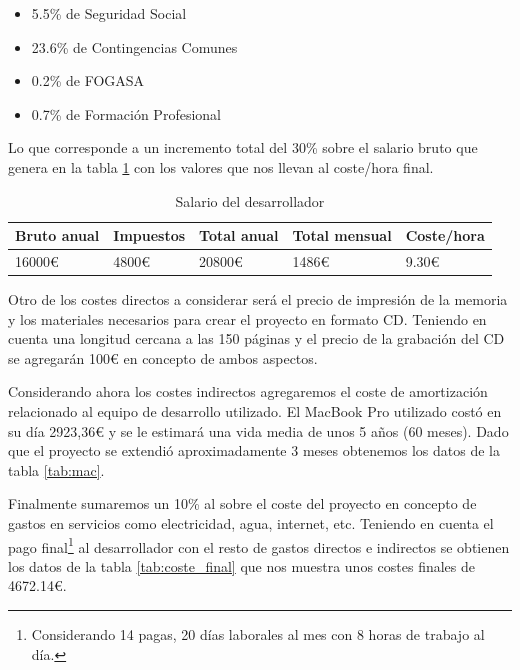 \begin{itemize}
	\item 5.5\% de Seguridad Social
	\item 23.6\% de Contingencias Comunes
	\item 0.2\% de FOGASA
	\item 0.7\% de Formación Profesional
\end{itemize}

Lo que corresponde a un incremento total del 30\% sobre el salario bruto que genera en la tabla \ref{tab:salario} con los valores que nos llevan al coste/hora final.

\begin{table}
		\begin{tabular}{|l|l|l|l|l|}
			\hline
			\textbf{Bruto anual} & \textbf{Impuestos} & \textbf{Total anual} & \textbf{Total mensual} & \textbf{Coste/hora} \\
			
			\hline
			16000\euro{}& 4800\euro{} & 20800\euro{} & 1486\euro{} & 9.30\euro{} \\
			
			\hline
		\end{tabular}
		\caption{Salario del desarrollador}
		\label{tab:salario}
\end{table}

\bigskip

Otro de los costes directos a considerar será el precio de impresión de la memoria y los materiales necesarios para crear el proyecto en formato CD. Teniendo en cuenta una longitud cercana a las 150 páginas y el precio de la grabación del CD se agregarán 100\euro{} en concepto de ambos aspectos.

\bigskip

Considerando ahora los costes indirectos agregaremos el coste de amortización relacionado al equipo de desarrollo utilizado. El MacBook Pro utilizado costó en su día 2923,36\euro{} y se le estimará una vida media de unos 5 años (60 meses). Dado que el proyecto se extendió aproximadamente 3 meses obtenemos los datos de la tabla \ref{tab:mac}.

Finalmente sumaremos un 10\% al sobre el coste del proyecto en concepto de gastos en servicios como electricidad, agua, internet, etc. Teniendo en cuenta el pago final\footnote{Considerando 14 pagas, 20 días laborales al mes con 8 horas de trabajo al día.} al desarrollador con el resto de gastos directos e indirectos se obtienen los datos de la tabla \ref{tab:coste_final} que nos muestra unos costes finales de 4672.14\euro{}.

